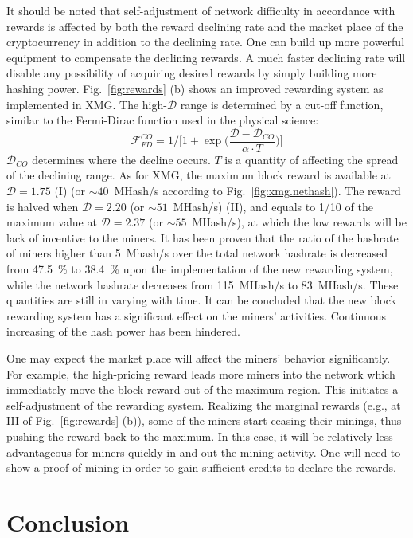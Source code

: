 \documentclass[aps,prl,reprint,showpacs,groupedaddress,letterpaper]{revtex4-1}
\newcommand{\bigdelim}[3]{\bigl#1#3\bigr#2}
\begin{document}
It should be noted that self-adjustment of network difficulty in accordance with rewards is affected by both the reward declining rate and the market place of the cryptocurrency in addition to the declining rate. One can build up more powerful equipment to compensate the declining rewards. A much faster declining rate will disable any possibility of acquiring desired rewards by simply building more hashing power. Fig.~\ref{fig:rewards} (b) shows an improved rewarding system as implemented in XMG. The high-$\mathcal{D}$ range is determined by a cut-off function, similar to the Fermi-Dirac function used in the physical science:
\begin{equation}\label{eq:fd}
\mathcal{F}_{FD}^{CO}
=1/\bigdelim{[}{]}{1+\exp\bigdelim{(}{)}{\frac{\mathcal{D}-\mathcal{D}_{CO}}{\alpha\cdot T}}}
\end{equation}
$\mathcal{D}_{CO}$ determines where the decline occurs. $T$ is a quantity of affecting the spread of the declining range. As for XMG, the maximum block reward is available at $\mathcal{D}=1.75$ (I) (or $\sim40$~MHash/s according to Fig.~\ref{fig:xmg.nethash}). The reward is halved when $\mathcal{D}=2.20$ (or $\sim51$~MHash/s)  (II), and equals to 1/10 of the maximum value at $\mathcal{D}=2.37$ (or $\sim55$~MHash/s), at which the low rewards will be lack of incentive to the miners. It has been proven that the ratio of the hashrate of miners higher than 5~Mhash/s over the total network hashrate is decreased from 47.5~\% to 38.4~\% upon the implementation of the new rewarding system, while the network hashrate decreases from 115~MHash/s to 83~MHash/s. These quantities are still in varying with time. It can be concluded that the new block rewarding system has a significant effect on the miners' activities. Continuous increasing of the hash power has been hindered.  

One may expect the market place will affect the miners' behavior significantly. For example, the high-pricing reward leads more miners into the network which immediately move the block reward out of the maximum region. This initiates a self-adjustment of the  rewarding system. Realizing the marginal rewards (e.g., at III of Fig.~\ref{fig:rewards} (b)), some of the miners start ceasing their minings, thus pushing the reward back to the maximum. In this case, it will be relatively less advantageous for miners quickly in and out the mining activity. One will need to show a proof of mining in order to gain sufficient credits to declare the rewards. 

\section{Conclusion}
\end{document}
